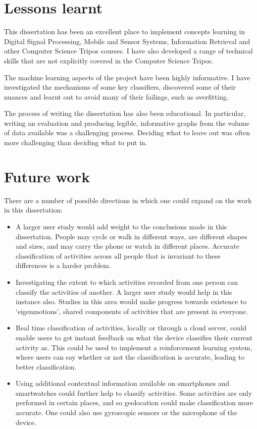   \section{Lessons learnt}
    This dissertation has been an excellent place to implement concepts learning in Digital Signal Processing, Mobile and Sensor Systems, Information Retrieval and other Computer Science Tripos courses. I have also developed a range of technical skills that are not explicitly covered in the Computer Science Tripos.
    
    The machine learning aspects of the project have been highly informative. I have investigated the mechanisms of some key classifiers, discovered some of their nuances and learnt out to avoid many of their failings, such as overfitting.
    
    The process of writing the dissertation has also been educational. In particular, writing an evaluation and producing legible, informative graphs from the volume of data available was a challenging process. Deciding what to leave out was often more challenging than deciding what to put in.
  \clearpage
  \section{Future work}
    There are a number of possible directions in which one could expand on the work in this dissertation:
    
    \begin{itemize}
      \item A larger user study would add weight to the conclusions made in this dissertation. People may cycle or walk in different ways, are different shapes and sizes, and may carry the phone or watch in different places. Accurate classification of activities across all people that is invariant to these differences is a harder problem.
      \item Investigating the extent to which activities recorded from one person can classify the activities of another. A larger user study would help in this instance also. Studies in this area would make progress towards existence to `eigenmotions', shared components of activities that are present in everyone.
      \item Real time classification of activities, locally or through a cloud server, could enable users to get instant feedback on what the device classifies their current activity as. This could be used to implement a reinforcement learning system, where users can say whether or not the classification is accurate, leading to better classification.
      \item Using additional contextual information available on smartphones and smartwatches could further help to classify activities. Some activities are only performed in certain places, and so geolocation could make classification more accurate. One could also use gyroscopic sensors or the microphone of the device.
    \end{itemize}
    